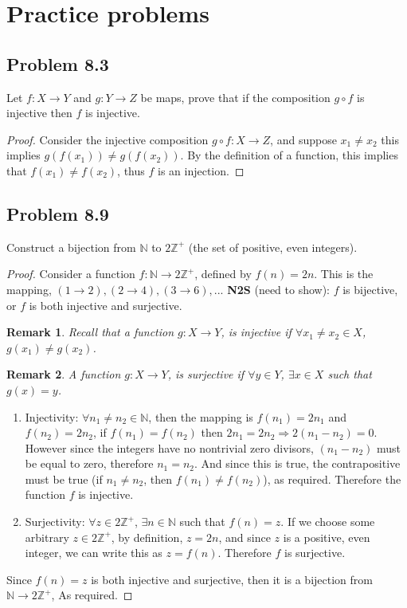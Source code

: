 \documentclass[12pt]{article}
\title{\scalebox{2}{Math 341 Homework 8}}
\author{\scalebox{1.5}{Theo Koss}}
\date{October 2020}
\newtheorem*{remark}{Remark}
\newcommand{\N}{\mathbb{N}}
\newcommand{\Z}{\mathbb{Z}}
\begin{document}
\maketitle
\section{Practice problems}
\subsection{Problem 8.3}
Let $f:X\to Y$ and $g:Y\to Z$ be maps, prove that if the composition $g\circ f$ is injective then $f$ is injective.
\begin{proof}
Consider the injective composition $g\circ f:X\to Z$, and suppose $x_1\neq x_2$ this implies $g(f(x_1))\neq g(f(x_2))$. By the definition of a function, this implies that $f(x_1)\neq f(x_2)$, thus $f$ is an injection.
\end{proof}
\subsection{Problem 8.9}
Construct a bijection from $\N$ to $2\Z^+$ (the set of positive, even integers).
\begin{proof}
Consider a function $f:\N\to2\Z^+$, defined by $f(n)=2n$. This is the mapping, $(1\to2), (2\to4),(3\to6),...$
\newline \textbf{N2S} (need to show): $f$ is bijective, or $f$ is both injective and surjective.
\begin{remark}
Recall that a function $g:X\to Y$, is injective if $\forall x_1\neq x_2\in X$, $g(x_1)\neq g(x_2)$.\end{remark}
\begin{remark}
A function $g:X\to Y$, is surjective if $\forall y\in Y$, $\exists x\in X$ such that $g(x)=y$.\end{remark}
\begin{enumerate}
    \item Injectivity: $\forall n_1\neq n_2\in\N$, then the mapping is $f(n_1)=2n_1$ and $f(n_2)=2n_2$, if $f(n_1)=f(n_2)$ then $2n_1=2n_2\Longrightarrow2(n_1-n_2)=0$. However since the integers have no nontrivial zero divisors, $(n_1-n_2)$ must be equal to zero, therefore $n_1=n_2$. And since this is true, the contrapositive must be true (if $n_1\neq n_2$, then $f(n_1)\neq f(n_2)$), as required. Therefore the function $f$ is injective.
    \item Surjectivity: $\forall z\in 2\Z^+$, $\exists n\in\N$ such that $f(n)=z$. If we choose some arbitrary $z\in2\Z^+$, by definition, $z=2n$, and since $z$ is a positive, even integer, we can write this as $z=f(n)$. Therefore $f$ is surjective.
\end{enumerate}
Since $f(n)=z$ is both injective and surjective, then it is a bijection from $\N\to2\Z^+$, As required.
\end{proof}
\end{document}
